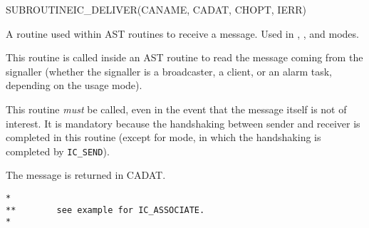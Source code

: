 \begin{routine} %
\subroutine
   {SUBROUTINE}{IC\_DELIVER}{(CANAME, CADAT, CHOPT, IERR)}
\begin{overview}
A routine used within AST routines to receive a message. Used in
\mailbox, \broadcast, and \alarm modes.

\end{overview}
\begin{argdeflist}
\end{argdeflist}
\begin{describe}

This routine is called inside an AST routine to read the message coming
from the signaller (whether the signaller is a broadcaster, a client,
or an alarm task, depending on the usage mode).

This routine {\em must} be called, even in the event that the
message itself is not of interest. It is mandatory because the handshaking
between sender and receiver is completed in this routine (except for
\mailbox mode, in which the handshaking is completed by \verb|IC_SEND|).

The message is returned in CADAT.

\end{describe}
\begin{options}
\end{options}
\begin{returncodes}
\end{returncodes}
\begin{examplecode}\begin{verbatim}
*
**        see example for IC_ASSOCIATE.
*
\end{verbatim}\end{examplecode}
\end{routine}

